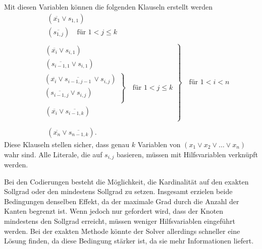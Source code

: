 Mit diesen Variablen können die folgenden Klauseln erstellt werden
\begin{align*}
&\hspace{14pt}(\overline{x_1} \lor s_{1,1})  \\
&\hspace{14pt}(\overline{s_{1,j}})  \quad \text{für } 1 < j \leq k \\
\\
&\left.\begin{array}{l}
\hspace{6pt}(\overline{x_i} \lor s_{i,1}) \\
\hspace{6pt}(\overline{s_{i-1,1}} \lor s_{i,1}) \\
\left.\begin{array}{l}
	\hspace{0pt}(\overline{x_i} \lor \overline{s_{i-1,j-1}} \hspace{2pt}\lor s_{i,j}) \\
	(\overline{s_{i-1,j}} \lor s_{i,j}) \\
\end{array}\right\} \quad \text{für } 1 < j \leq k \\
\hspace{6pt}(\overline{x_i} \lor \overline{s_{i-1,k}})\\
\end{array}\right\} \quad \text{für } 1 < i < n \\
\\
&\hspace{14pt}(\overline{x_n} \lor \overline{s_{n-1,k}}). 
\end{align*}
Diese Klauseln stellen sicher, dass genau \(k\) Variablen von \((x_1 \lor x_2 \lor \ldots \lor x_n)\) wahr sind.
Alle Literale, die auf \(s_{i,j}\) basieren, müssen mit Hilfsvariablen verknüpft werden.

Bei den Codierungen besteht die Möglichkeit, die Kardinalität auf den exakten Sollgrad oder den mindestens Sollgrad zu setzen.
Insgesamt erzielen beide Bedingungen denselben Effekt, da der maximale Grad durch die Anzahl der Kanten begrenzt ist.
Wenn jedoch nur gefordert wird, dass der Knoten mindestens den Sollgrad erreicht, müssen weniger Hilfsvariablen eingeführt werden.
Bei der exakten Methode könnte der Solver allerdings schneller eine Lösung finden, da diese Bedingung stärker ist, da sie mehr Informationen liefert.

